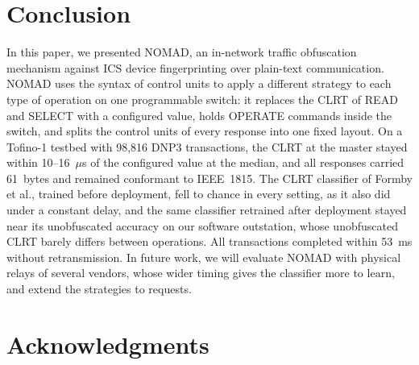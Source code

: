 \section{Conclusion}
\label{sec:conclusion}

In this paper, we presented NOMAD, an in-network traffic obfuscation mechanism against ICS device fingerprinting over plain-text communication. NOMAD uses the syntax of control units to apply a different strategy to each type of operation on one programmable switch: it replaces the CLRT of READ and SELECT with a configured value, holds OPERATE commands inside the switch, and splits the control units of every response into one fixed layout. On a Tofino-1 testbed with 98,816 DNP3 transactions, the CLRT at the master stayed within 10--16~$\mu$s of the configured value at the median, and all responses carried 61~bytes and remained conformant to IEEE~1815. The CLRT classifier of Formby et al., trained before deployment, fell to chance in every setting, as it also did under a constant delay, and the same classifier retrained after deployment stayed near its unobfuscated accuracy on our software outstation, whose unobfuscated CLRT barely differs between operations. All transactions completed within 53~ms without retransmission. In future work, we will evaluate NOMAD with physical relays of several vendors, whose wider timing gives the classifier more to learn, and extend the strategies to requests.

\section*{Acknowledgments}
